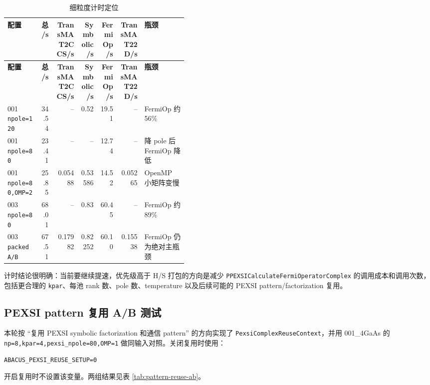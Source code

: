 \documentclass[a4paper,11pt]{article}
\newcommand{\code}[1]{\texttt{#1}}
\begin{document}
{\scriptsize
\begin{longtable}{@{}p{0.18\linewidth}r r r r r p{0.24\linewidth}@{}}
\caption{细粒度计时定位}
\label{tab:detailed-timing}\\
\toprule
\textbf{配置} & \textbf{总/s} & \textbf{TransMAT2CCS/s} & \textbf{Symbolic/s} & \textbf{FermiOp/s} & \textbf{TransMAT22D/s} & \textbf{瓶颈}\\
\midrule
\endfirsthead
\toprule
\textbf{配置} & \textbf{总/s} & \textbf{TransMAT2CCS/s} & \textbf{Symbolic/s} & \textbf{FermiOp/s} & \textbf{TransMAT22D/s} & \textbf{瓶颈}\\
\midrule
\endhead
001 \code{npole=120} & 34.54 & -- & 0.52 & 19.51 & -- & FermiOp 约 56\%\\
001 \code{npole=80} & 23.41 & -- & -- & 12.74 & -- & 降 pole 后 FermiOp 降低\\
001 \code{npole=80,OMP=2} & 25.85 & 0.05488 & 0.53586 & 14.52 & 0.05265 & OpenMP 小矩阵变慢\\
003 \code{npole=80} & 68.01 & -- & 0.83 & 60.45 & -- & FermiOp 约 89\%\\
003 \code{packed A/B} & 67.51 & 0.17982 & 0.82252 & 60.10 & 0.15538 & FermiOp 仍为绝对主瓶颈\\
\bottomrule
\end{longtable}
}

计时结论很明确：当前要继续提速，优先级高于 H/S 打包的方向是减少 \code{PPEXSICalculateFermiOperatorComplex} 的调用成本和调用次数，包括更合理的 \code{kpar}、每池 rank 数、pole 数、temperature 以及后续可能的 PEXSI pattern/factorization 复用。

\subsection{PEXSI pattern 复用 A/B 测试}

本轮按 ``复用 PEXSI symbolic factorization 和通信 pattern'' 的方向实现了 \code{PexsiComplexReuseContext}，并用 001\_4GaAs 的 \code{np=8,kpar=4,pexsi\_npole=80,OMP=1} 做同输入对照。关闭复用时使用：

\begin{verbatim}
ABACUS_PEXSI_REUSE_SETUP=0
\end{verbatim}

开启复用时不设置该变量。两组结果见表 \ref{tab:pattern-reuse-ab}。
\end{document}
